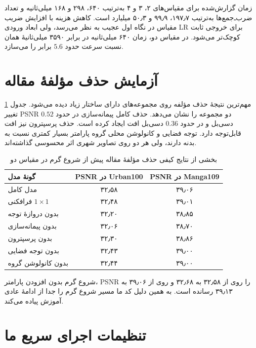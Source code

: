 زمان گزارش‌شده برای مقیاس‌های ۲، ۳ و ۴ به‌ترتیب ۶۴۰، ۲۹۸ و ۱۶۸ میلی‌ثانیه و تعداد ضرب‌ـ‌جمع‌ها به‌ترتیب ۱۹۷٫۷، ۹۹٫۹ و ۵۰٫۳ میلیارد است. کاهش هزینه با افزایش ضریب مقیاس در نگاه اول عجیب به نظر می‌رسد، ولی ابعاد ورودی LR برای خروجی ثابت کوچک‌تر می‌شود. در مقیاس دو، زمان ۶۴۰ میلی‌ثانیه در برابر ۳۵۹۰ میلی‌ثانیهٔ  همان نسبت سرعت حدود $5.6$ برابر را می‌سازد.

\section{آزمایش حذف مؤلفهٔ مقاله}

مهم‌ترین نتیجهٔ حذف مؤلفه روی مجموعه‌های دارای ساختار زیاد دیده می‌شود. جدول \ref{tab:paper-ablation-quality} تغییر PSNR دو مجموعه را نشان می‌دهد. حذف کامل پیمانه‌سازی در  حدود $0.52$ دسی‌بل و در  حدود $0.36$ دسی‌بل افت ایجاد کرده است. حذف پرسپترون نیز افت قابل‌توجه دارد. توجه فضایی و کانولوشن محلی گروه پارامتر بسیار کمتری نسبت به بدنه دارند، ولی هر دو روی تصاویر شهری اثر محسوسی گذاشته‌اند.

\begin{table}[H]
\centering
\caption{بخشی از نتایج کیفی حذف مؤلفهٔ مقاله پیش از شروع گرم در مقیاس دو}
\label{tab:paper-ablation-quality}
\begin{tabular}{lcc}
\toprule
گونهٔ مدل & PSNR در Urban100 & PSNR در Manga109 \\
\midrule
مدل کامل & ۳۲٫۵۸ & ۳۹٫۰۶ \\
فرافکنی $1\times1$ & ۳۲٫۴۸ & ۳۹٫۰۱ \\
بدون دروازهٔ توجه & ۳۲٫۲۰ & ۳۸٫۸۵ \\
بدون پیمانه‌سازی & ۳۲٫۰۶ & ۳۸٫۷۰ \\
بدون پرسپترون & ۳۲٫۳۰ & ۳۸٫۸۶ \\
بدون توجه فضایی & ۳۲٫۴۳ & ۳۹٫۰۰ \\
بدون کانولوشن گروه & ۳۲٫۴۴ & ۳۹٫۰۰ \\
\bottomrule
\end{tabular}
\end{table}

شروع گرم بدون افزودن پارامتر، PSNR را روی  از ۳۲٫۵۸ به ۳۲٫۶۸ و روی  از ۳۹٫۰۶ به ۳۹٫۱۳ رسانده است. به همین دلیل کد ما مسیر شروع گرم را جدا از ادامهٔ عادی آموزش پیاده می‌کند.


\iffalse
\section{تنظیمات اجرای سریع ما}

